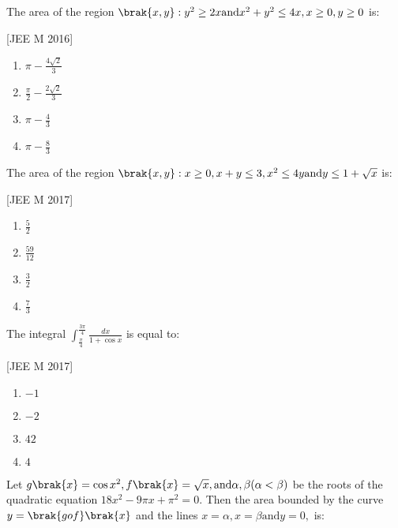 \iffalse
  \title{DEFINITE INTEGRALS}
  \author{Pushkar Gudla-AI24BTECH11012}
  \section{mains}
\fi
	\item The area  of the region $\brak{x,y}:y^{2}\geq 2x \text{and} x^{2}+y^{2}\leq 4x, x\geq0, y\geq0$ is:

		\hfill{[JEE M 2016]}
		\begin{enumerate}
			\item $\pi - \frac{4\sqrt{2}}{3}$

			\item $\frac{\pi}{2}-\frac{2\sqrt{2}}{3}$

			\item $\pi - \frac{4}{3}$

			\item $\pi - \frac{8}{3}$
		\end{enumerate}
	\item The area  of the region $\brak{x,y}: x\geq0, x+y\leq3, x^{2}\leq4y \text{and} y\leq1+\sqrt{x}$ is:

		\hfill{[JEE M 2017]}
		\begin{enumerate}
			\item $\frac{5}{2}$

			\item $\frac{59}{12}$

			\item $\frac{3}{2}$

			\item $\frac{7}{3}$
		\end{enumerate}
	\item The integral $\int_{\frac{\pi}{4}}^{\frac{3\pi}{4}}\frac{dx}{1+\cos x}$ is equal to:

		\hfill{[JEE M 2017]}
		\begin{enumerate}
			\item $-1$
			\item $-2$
			\item $42$
			\item $4$
		\end{enumerate}
	\item Let $g\brak{x}=\cos x^{2}, f\brak{x}=\sqrt{x}, \text{and} \alpha, \beta (\alpha<\beta)$ be the roots of the quadratic equation $18x^{2}-9\pi x+\pi^{2}=0.$ Then the area  bounded by the curve $y=\brak{gof}\brak{x}$ and the lines $x=\alpha, x=\beta \text{and} y=0,$ is:

